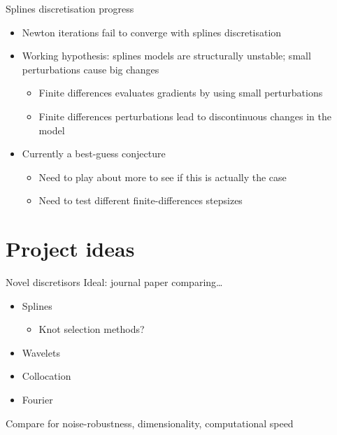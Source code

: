 \documentclass[presentation]{beamer}
\begin{document}
\begin{frame}[label={sec:org024bc59}]{Splines discretisation progress}
\begin{itemize}
\item Newton iterations fail to converge with splines discretisation
\end{itemize}
\vfill
\begin{itemize}
\item Working hypothesis: splines models are structurally unstable; small perturbations cause big changes
\begin{itemize}
\item Finite differences evaluates gradients by using small perturbations
\item Finite differences perturbations lead to discontinuous changes in the model
\end{itemize}
\end{itemize}
\vfill
\begin{itemize}
\item Currently a best-guess conjecture
\begin{itemize}
\item Need to play about more to see if this is actually the case
\item Need to test different finite-differences stepsizes
\end{itemize}
\end{itemize}
\end{frame}


\section{Project ideas}
\label{sec:orgeeeae7d}
\begin{frame}[label={sec:orga88abc4}]{Novel discretisors}
Ideal: journal paper comparing\ldots{}
\vfill
\begin{itemize}
\item Splines
\begin{itemize}
\item Knot selection methods?
\end{itemize}
\item Wavelets
\item Collocation
\item Fourier
\end{itemize}

\vfill
Compare for noise-robustness, dimensionality, computational speed
\end{frame}
\end{document}
